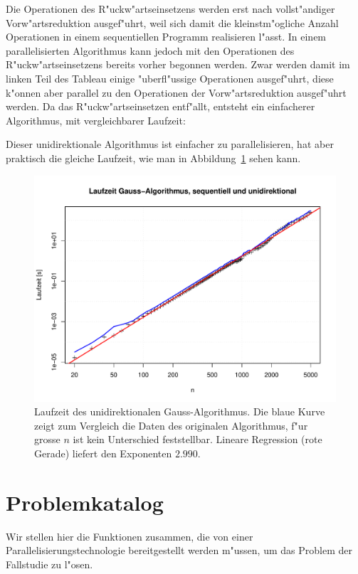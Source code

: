 Die Operationen des R"uckw"artseinsetzens werden erst nach vollst"andiger
Vorw"artsreduktion ausgef"uhrt, weil sich damit die kleinstm"ogliche
Anzahl Operationen in einem sequentiellen Programm realisieren l"asst.
In einem parallelisierten Algorithmus kann jedoch mit den Operationen
des R"uckw"artseinsetzens bereits vorher begonnen werden. Zwar werden damit
im linken Teil des Tableau einige "uberfl"ussige Operationen ausgef"uhrt,
diese k"onnen aber parallel zu den Operationen der Vorw"artsreduktion
ausgef"uhrt werden.
Da das R"uckw"arts\-einsetzen entf"allt, entsteht ein einfacherer Algorithmus,
mit vergleichbarer Laufzeit:

Dieser unidirektionale Algorithmus ist einfacher zu parallelisieren, hat
aber praktisch die gleiche Laufzeit, wie man in Abbildung~\ref{gauss-uni}
sehen kann.
\begin{figure}
\begin{center}
\includegraphics[width=\hsize]{images/gauss-uni.pdf}
\end{center}
\caption{Laufzeit des unidirektionalen Gauss-Algorithmus. Die blaue Kurve
zeigt zum Vergleich die Daten des originalen Algorithmus, f"ur grosse
$n$ ist kein Unterschied feststellbar.
Lineare Regression (rote Gerade) liefert den Exponenten $2.990$.
\label{gauss-uni}}
\end{figure}

\section{Problemkatalog}
Wir stellen hier die Funktionen zusammen, die von einer
Parallelisierungstechnologie bereitgestellt werden m"ussen, um das Problem
der Fallstudie zu l"osen.

